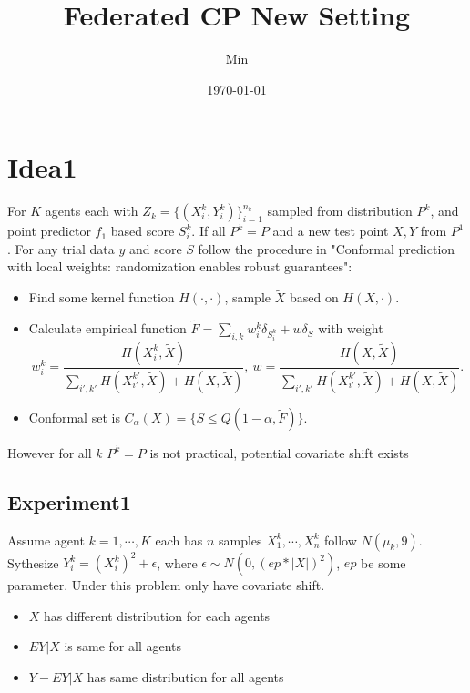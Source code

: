 \documentclass[12pt, a4paper, oneside]{article}
\title{\textbf{Federated CP New Setting}}
\author{Min}
\date{\today}
\begin{document}
\maketitle
\setcounter{page}{1}
\section{Idea1}
    For $K$ agents each with $Z_k=\{(X_i^k,Y_i^k)\}_{i=1}^{n_k}$ sampled from distribution $P^k$, and point predictor $f_1$ based score $S_i^k$. If all $P^k=P$ and a new test point $X,Y$ from $P^1$. For any trial data $y$ and score $S$ follow the procedure in "Conformal prediction with local weights: randomization enables robust guarantees"\cite{hore2023conformal}:
    \begin{itemize}
        \item Find some kernel function $H(\cdot,\cdot)$, sample $\tilde{X}$ based on $H(X,\cdot)$.
        \item Calculate empirical function $\tilde{F}=\overset{}{\underset{i,k}\sum}w_i^k\delta_{S_i^k}+w\delta_{S}$ with weight
        \begin{equation*}
            w_i^k=\dfrac{H(X_i^k,\tilde{X})}{\overset{}{\underset{i',k'}\sum}H(X_{i'}^{k'},\tilde{X})+H(X,\tilde{X})},\ w=\dfrac{H(X,\tilde{X})}{\overset{}{\underset{i',k'}\sum}H(X_{i'}^{k'},\tilde{X})+H(X,\tilde{X})}.
        \end{equation*}
        \item Conformal set is $C_\alpha(X)=\{S\leq Q(1-\alpha,\tilde{F})\}$.
    \end{itemize}


    However for all $k$ $P^k=P$ is not practical, potential covariate shift exists

\subsection{Experiment1}
    Assume agent $k=1,\cdots,K$ each has $n$ samples $X_1^k,\cdots,X_n^k$ follow $N(\mu_k,9)$. Sythesize $Y_i^k=(X_i^k)^2+\epsilon$, where $\epsilon\sim N(0,(ep*|X|)^2)$, $ep$ be some parameter. Under this problem only have covariate shift.

    \begin{itemize}
        \item $X$ has different distribution for each agents
        \item $EY|X$ is same for all agents
        \item $Y-EY|X$ has same distribution for all agents
    \end{itemize}
    
\end{document}
